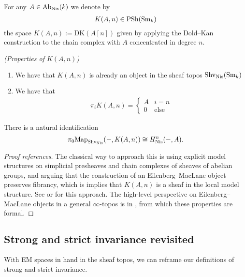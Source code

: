 \documentclass[11pt,openany]{book}
\providecommand{\DK}{\mathrm{DK}}
\begin{document}
\begin{definition} For any $A\in \mathrm{Ab}_{\mathrm{Nis}}(k)$ we denote by
\begin{align*}
    K(A,n) \in \mathrm{PSh}(\mathrm{Sm}_k)
\end{align*}
the space $K(A,n):= \DK(A[n])$ given by applying the Dold--Kan construction to the chain complex with $A$ concentrated in degree $n$.
\end{definition}

\begin{proposition} \textit{(Properties of $K(A,n)$)}
\begin{enumerate}
    \item We have that $K(A,n)$ is already an object in the sheaf topos $\mathrm{Shv}_{\mathrm{Nis}}(\mathrm{Sm}_k)$
    \item We have that
    \begin{align*}
        \pi_i K(A,n) = \begin{cases} A & i=n \\ 0 & \text{else} \end{cases}
    \end{align*}
\end{enumerate}
\item There is a natural identification
\begin{align*}
    \pi_0 \mathrm{Map}_{\mathrm{Shv}_{\mathrm{Nis}}}(-,K(A,n)) \cong H^n_{\mathrm{Nis}}(-,A).
\end{align*}
\end{proposition}
\begin{proof}[Proof references] The classical way to approach this is using explicit model structures on simplicial presheaves and chain complexes of sheaves of abelian groups, and arguing that the construction of an Eilenberg--MacLane object preserves fibrancy, which is implies that $K(A,n)$ is a sheaf in the local model structure.  See \cite[Chapter~6]{Morel} or \cite[pp.56---59]{MV} for this approach. The high-level perspective on Eilenberg--MacLane objects in a general $\infty$-topos is in \cite[\S7.2.2]{HTT}, from which these properties are formal.
\end{proof}



\subsection{Strong and strict invariance revisited}

With EM spaces in hand in the sheaf topos, we can reframe our definitions of strong and strict invariance.
\end{document}
